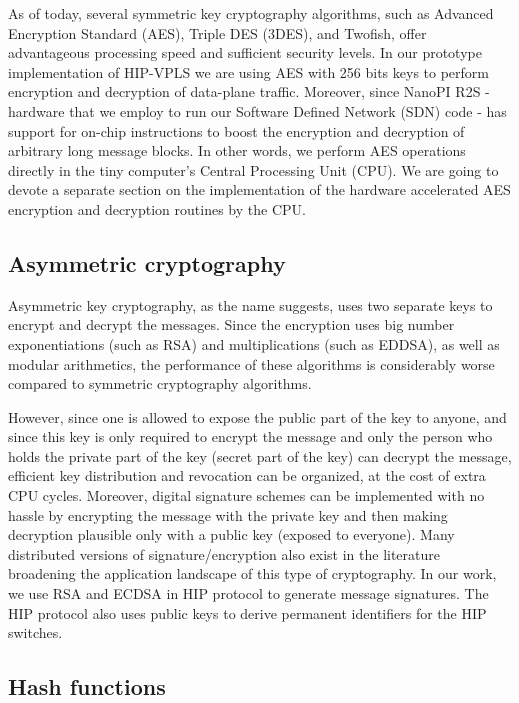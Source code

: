 As of today, several symmetric key cryptography algorithms, such as Advanced 
Encryption Standard (AES), Triple DES (3DES), and Twofish, offer advantageous 
processing speed and sufficient security levels. In our prototype implementation 
of HIP-VPLS we are using AES with 256 bits keys to perform encryption and 
decryption of data-plane traffic. Moreover, since NanoPI R2S - hardware that 
we employ to run our Software Defined Network (SDN) code - has support for 
on-chip instructions to boost the encryption and decryption of arbitrary long 
message blocks. In other words, we perform AES operations directly in the tiny 
computer's Central Processing Unit (CPU). We are going to devote a separate 
section on the implementation of the hardware accelerated AES encryption and 
decryption routines by the CPU.

\subsection{Asymmetric cryptography}

Asymmetric key cryptography, as the name suggests, uses two separate keys to 
encrypt and decrypt the messages. Since the encryption uses big number 
exponentiations (such as RSA) and multiplications (such as EDDSA), as well 
as modular arithmetics, the performance of these algorithms is considerably 
worse compared to symmetric cryptography algorithms. 

However, since one is allowed to expose the public part of the key to anyone, 
and since this key is only required to encrypt the message and only the person 
who holds the private part of the key (secret part of the key) can decrypt the 
message, efficient key distribution and revocation can be organized, at the 
cost of extra CPU cycles. Moreover, digital signature schemes can be implemented 
with no hassle by encrypting the message with the private key and then making 
decryption plausible only with a public key (exposed to everyone). Many distributed 
versions of signature/encryption also exist in the literature broadening the 
application landscape of this type of cryptography. In our work, we use RSA and 
ECDSA in HIP protocol to generate message signatures. The HIP protocol also uses 
public keys to derive permanent identifiers for the HIP switches.
 

\subsection{Hash functions}

